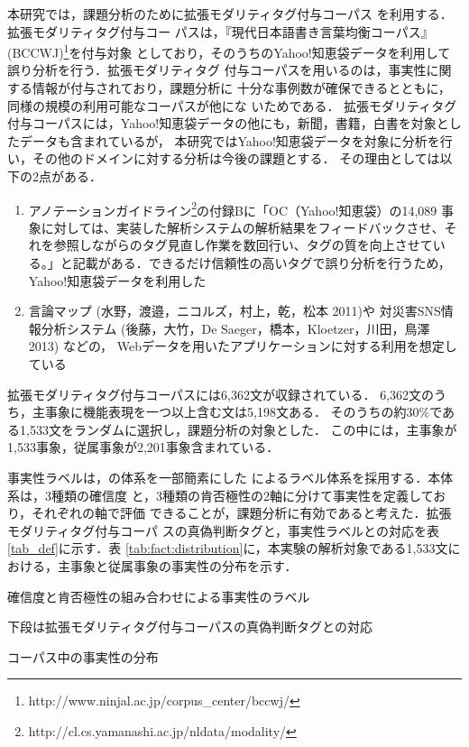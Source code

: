 \documentclass[japanese]{jnlp_1.4}
\begin{document}
本研究では，課題分析のために拡張モダリティタグ付与コーパス
\cite{Matsuyoshi2010,Matsuyoshi2011}を利用する．拡張モダリティタグ付与コー
パスは，『現代日本語書き言葉均衡コーパス』(BCCWJ)\footnote{http://www.ninjal.ac.jp/corpus\_center/bccwj/}を付与対象
としており，そのうちのYahoo!知恵袋データを利用して誤り分析を行う．拡張モダリティタグ
付与コーパスを用いるのは，事実性に関する情報が付与されており，課題分析に
十分な事例数が確保できるとともに，同様の規模の利用可能なコーパスが他にな
いためである．
拡張モダリティタグ付与コーパスには，Yahoo!知恵袋データの他にも，新聞，書籍，白書を対象としたデータも含まれているが，
本研究ではYahoo!知恵袋データを対象に分析を行い，その他のドメインに対する分析は今後の課題とする．
その理由としては以下の2点がある．
\begin{enumerate}
  \renewcommand{\labelenumi}{}
  \item アノテーションガイドライン\footnote{http://cl.cs.yamanashi.ac.jp/nldata/modality/}の付録Bに「OC（Yahoo!知恵袋）の14,089 事象に対しては、実装した解析システムの解析結果をフィードバックさせ、それを参照しながらのタグ見直し作業を数回行い、タグの質を向上させている。」と記載がある．できるだけ信頼性の高いタグで誤り分析を行うため，Yahoo!知恵袋データを利用した
      \item 言論マップ (水野，渡邉，ニコルズ，村上，乾，松本 2011)\nocite{Mizuno2011}や
    対災害SNS情報分析システム (後藤，大竹，De Saeger，橋本，Kloetzer，川田，鳥澤 2013)\nocite{Goto2013} などの，
Webデータを用いたアプリケーションに対する利用を想定している
\end{enumerate}
拡張モダリティタグ付与コーパスには6,362文が収録されている．
6,362文のうち，主事象に機能表現を一つ以上含む文は5,198文ある．
そのうちの約30\%である1,533文をランダムに選択し，課題分析の対象とした．
この中には，主事象が1,533事象，従属事象が2,201事象含まれている．

事実性ラベルは，の体系を一部簡素にした
によるラベル体系を採用する．本体系は，3種類の確信度
と，3種類の肯否極性の2軸に分けて事実性を定義しており，それぞれの軸で評価
できることが，課題分析に有効であると考えた．拡張モダリティタグ付与コーパ
スの真偽判断タグと，事実性ラベルとの対応を表\ref{tab_def}に示す．表
\ref{tab:fact:distribution}に，本実験の解析対象である1,533文における，主事象と従属事象の事実性の分布を示す．

\begin{table}[b]
\caption{確信度と肯否極性の組み合わせによる事実性のラベル}
\label{tab_def}

\vspace{4pt}\small 下段は拡張モダリティタグ付与コーパスの真偽判断タグとの対応
\end{table}
\begin{table}[b]
\caption{コーパス中の事実性の分布}
\label{tab:fact:distribution}

\end{table}
\end{document}
